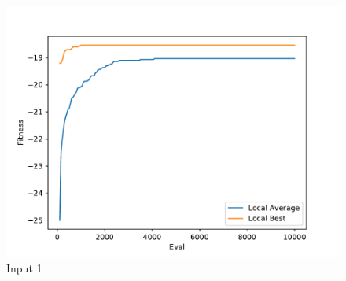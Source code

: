 \documentclass{standalone}
\begin{document}
\begin{figure}[!htb]
	\caption{Input 1}
	\label{fig:graph_1031}
	\includegraphics[width=\textwidth]{../graphs/graphs/1031.pdf}
\end{figure}
\end{document}
